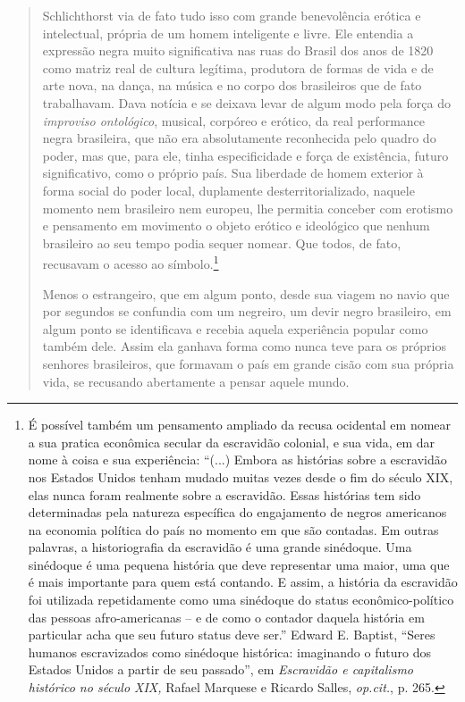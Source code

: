 \begin{quote}
Schlichthorst via de fato tudo isso com grande benevolência erótica e
intelectual, própria de um homem inteligente e livre. Ele entendia a
expressão negra muito significativa nas ruas do Brasil dos anos de 1820
como matriz real de cultura legítima, produtora de formas de vida e de
arte nova, na dança, na música e no corpo dos brasileiros que de fato
trabalhavam. Dava notícia e se deixava levar de algum modo pela força do
\emph{improviso ontológico}, musical, corpóreo e erótico, da real
performance negra brasileira, que não era absolutamente reconhecida pelo
quadro do poder, mas que, para ele, tinha especificidade e força de
existência, futuro significativo, como o próprio país. Sua liberdade de
homem exterior à forma social do poder local, duplamente
desterritorializado, naquele momento nem brasileiro nem europeu, lhe
permitia conceber com erotismo e pensamento em movimento o objeto
erótico e ideológico que nenhum brasileiro ao seu tempo podia sequer
nomear. Que todos, de fato, recusavam o acesso ao símbolo.\footnote{É
  possível também um pensamento ampliado da recusa ocidental em nomear a
  sua pratica econômica secular da escravidão colonial, e sua vida, em
  dar nome à coisa e sua experiência: ``(...) Embora as histórias sobre
  a escravidão nos Estados Unidos tenham mudado muitas vezes desde o fim
  do século XIX, elas nunca foram realmente sobre a escravidão. Essas
  histórias tem sido determinadas pela natureza específica do
  engajamento de negros americanos na economia política do país no
  momento em que são contadas. Em outras palavras, a historiografia da
  escravidão é uma grande sinédoque. Uma sinédoque é uma pequena
  história que deve representar uma maior, uma que é mais importante
  para quem está contando. E assim, a história da escravidão foi
  utilizada repetidamente como uma sinédoque do status
  econômico-político das pessoas afro-americanas -- e de como o contador
  daquela história em particular acha que seu futuro status deve ser.''
  Edward E. Baptist, ``Seres humanos escravizados como sinédoque
  histórica: imaginando o futuro dos Estados Unidos a partir de seu
  passado'', em \emph{Escravidão e capitalismo histórico no século XIX,}
  Rafael Marquese e Ricardo Salles, \emph{op.cit.}, p. 265.}

Menos o estrangeiro, que em algum ponto, desde sua viagem no navio que
por segundos se confundia com um negreiro, um devir negro brasileiro, em
algum ponto se identificava e recebia aquela experiência popular como
também dele. Assim ela ganhava forma como nunca teve para os próprios
senhores brasileiros, que formavam o país em grande cisão com sua
própria vida, se recusando abertamente a pensar aquele mundo.


\end{quote}

